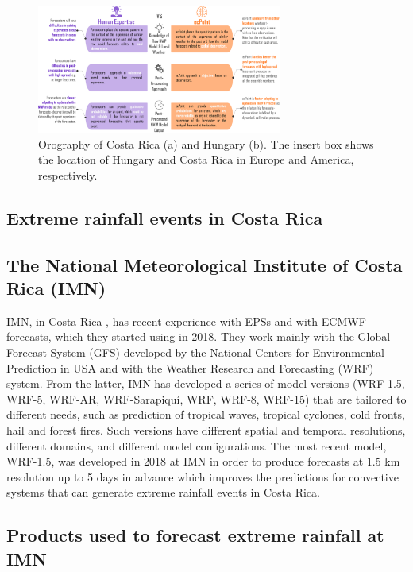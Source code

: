 \documentclass[twocol]{ametsocV5} %
\begin{document}
\begin{figure}
\centerline{\includegraphics[width=19pc]{manuscript/Figures/Fig2.png}}
\caption{Orography of Costa Rica (a) and Hungary (b). The insert box shows the location of Hungary and Costa Rica in Europe and America, respectively.}
\label{Fig2}
\end{figure}

\subsection{Extreme rainfall events in Costa Rica}

\subsection{ The National Meteorological Institute of Costa Rica (IMN)} 
IMN, in Costa Rica , has recent experience with EPSs and with ECMWF forecasts, which they started using in 2018. They work mainly with the Global Forecast System (GFS) developed by the National Centers for Environmental Prediction in USA and with the Weather Research and Forecasting (WRF) system. From the latter, IMN has developed a series of model versions (WRF-1.5, WRF-5, WRF-AR, WRF-Sarapiquí, WRF, WRF-8, WRF-15) that are tailored to different needs, such as prediction of tropical waves, tropical cyclones, cold fronts, hail and forest fires. Such versions have different spatial and temporal resolutions, different domains, and different model configurations. The most recent model, WRF-1.5, was developed in 2018 at IMN in order to produce forecasts at 1.5 km resolution up to 5 days in advance which improves the predictions for convective systems that can generate extreme rainfall events in Costa Rica. 

\subsection{Products used to forecast extreme rainfall at IMN}
\end{document}
